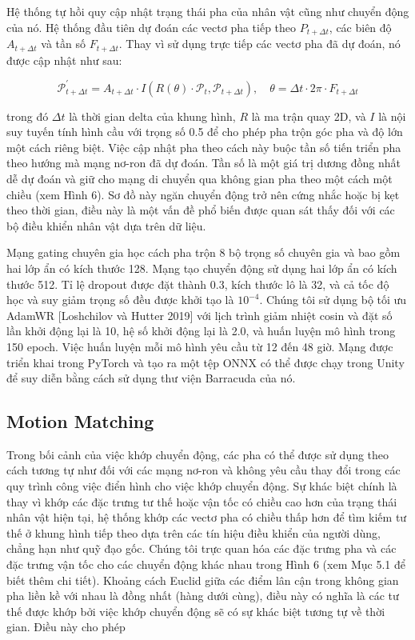 Hệ thống tự hồi quy cập nhật trạng thái pha của nhân vật cũng như chuyển động của nó. Hệ thống đầu tiên dự đoán các vectơ pha tiếp theo $P_{t+\Delta t}$, các biên độ $A_{t+\Delta t}$ và tần số $F_{t+\Delta t}$. Thay vì sử dụng trực tiếp các vectơ pha đã dự đoán, nó được cập nhật như sau:

\begin{equation}
	\label{eq:PhaseVector}
	\mathcal{P}_{t+\Delta t}^{\prime}=A_{t+\Delta t} \cdot I\left(R(\theta) \cdot \mathcal{P}_t, \mathcal{P}_{t+\Delta t}\right), \quad \theta=\Delta t \cdot 2 \pi \cdot F_{t+\Delta t}
\end{equation}

trong đó $\Delta t$ là thời gian delta của khung hình, $R$ là ma trận quay 2D, và \(I\) là nội suy tuyến tính hình cầu với trọng số 0.5 để cho phép pha trộn góc pha và độ lớn một cách riêng biệt. Việc cập nhật pha theo cách này buộc tần số tiến triển pha theo hướng mà mạng nơ-ron đã dự đoán. Tần số là một giá trị dương đồng nhất dễ dự đoán và giữ cho mạng di chuyển qua không gian pha theo một cách một chiều (xem Hình 6). Sơ đồ này ngăn chuyển động trở nên cứng nhắc hoặc bị kẹt theo thời gian, điều này là một vấn đề phổ biến được quan sát thấy đối với các bộ điều khiển nhân vật dựa trên dữ liệu.

Mạng gating chuyên gia học cách pha trộn 8 bộ trọng số chuyên gia và bao gồm hai lớp ẩn có kích thước 128. Mạng tạo chuyển động sử dụng hai lớp ẩn có kích thước 512. Tỉ lệ dropout được đặt thành 0.3, kích thước lô là 32, và cả tốc độ học và suy giảm trọng số đều được khởi tạo là \(10^{-4}\). Chúng tôi sử dụng bộ tối ưu AdamWR [Loshchilov và Hutter 2019] với lịch trình giảm nhiệt cosin và đặt số lần khởi động lại là 10, hệ số khởi động lại là 2.0, và huấn luyện mô hình trong 150 epoch. Việc huấn luyện mỗi mô hình yêu cầu từ 12 đến 48 giờ. Mạng được triển khai trong PyTorch và tạo ra một tệp ONNX có thể được chạy trong Unity để suy diễn bằng cách sử dụng thư viện Barracuda của nó.


\subsection{Motion Matching}

Trong bối cảnh của việc khớp chuyển động, các pha có thể được sử dụng theo cách tương tự như đối với các mạng nơ-ron và không yêu cầu thay đổi trong các quy trình công việc điển hình cho việc khớp chuyển động. Sự khác biệt chính là thay vì khớp các đặc trưng tư thế hoặc vận tốc có chiều cao hơn của trạng thái nhân vật hiện tại, hệ thống khớp các vectơ pha có chiều thấp hơn để tìm kiếm tư thế ở khung hình tiếp theo dựa trên các tín hiệu điều khiển của người dùng, chẳng hạn như quỹ đạo gốc. Chúng tôi trực quan hóa các đặc trưng pha và các đặc trưng vận tốc cho các chuyển động khác nhau trong Hình 6 (xem Mục 5.1 để biết thêm chi tiết). Khoảng cách Euclid giữa các điểm lân cận trong không gian pha liền kề với nhau là đồng nhất (hàng dưới cùng), điều này có nghĩa là các tư thế được khớp bởi việc khớp chuyển động sẽ có sự khác biệt tương tự về thời gian. Điều này cho phép

